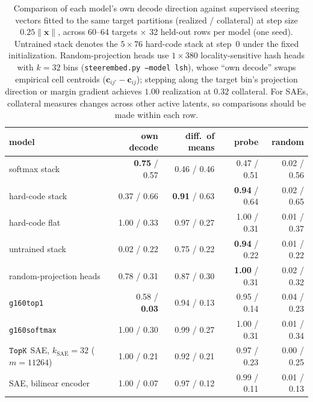 \begin{table}[htbp]\centering\small
\begin{tabular}{@{}lrrrr@{}}
\toprule
model & own decode & diff.\ of means & probe & random \\
\midrule
softmax stack & \textbf{0.75} / 0.57 & 0.46 / 0.46 & 0.47 / 0.51 & 0.02 / 0.56 \\
hard-code stack & 0.37 / 0.66 & \textbf{0.91} / 0.63 & \textbf{0.94} / 0.64 & 0.02 / 0.65 \\
hard-code flat & 1.00 / 0.33 & 0.97 / 0.27 & 1.00 / 0.31 & 0.01 / 0.37 \\
untrained stack & 0.02 / 0.22 & 0.75 / 0.22 & \textbf{0.94} / 0.22 & 0.01 / 0.22 \\
random-projection heads & 0.78 / 0.31 & 0.87 / 0.30 & \textbf{1.00} / 0.31 & 0.02 / 0.32 \\
\texttt{g160top1} & 0.58 / \textbf{0.03} & 0.94 / 0.13 & 0.95 / 0.14 & 0.04 / 0.23 \\
\texttt{g160softmax} & 1.00 / 0.30 & 0.99 / 0.27 & 1.00 / 0.31 & 0.01 / 0.34 \\
$\mathop{\mathtt{TopK}}\limits$ SAE, $k_{\mathrm{SAE}}{=}32$ ($m{=}11264$) & 1.00 / 0.21 & 0.92 / 0.21 & 0.97 / 0.23 & 0.00 / 0.25 \\
SAE, bilinear encoder & 1.00 / 0.07 & 0.97 / 0.12 & 0.99 / 0.11 & 0.01 / 0.13 \\
\bottomrule
\end{tabular}
\caption{Comparison of each model's own decode direction against supervised
steering vectors fitted to the same target partitions (realized / collateral)
at step size $0.25\lVert \mathbf{x}\rVert$, across 60--64 targets $\times$
32 held-out rows per model (one seed). Untrained stack denotes the
$5\times76$ hard-code stack at step~0 under the fixed initialization.
Random-projection heads use $1\times380$ locality-sensitive hash heads with
$k{=}32$ bins (\texttt{steerembed.py --model lsh}), whose ``own decode''
swaps empirical cell centroids ($\mathbf{c}_{ij'} - \mathbf{c}_{ij}$);
stepping along the target bin's projection direction or margin gradient
achieves $1.00$ realization at $0.32$ collateral. For SAEs, collateral
measures changes across other active latents, so comparisons should be made
within each row.}
\label{tab:steersup}
\end{table}

